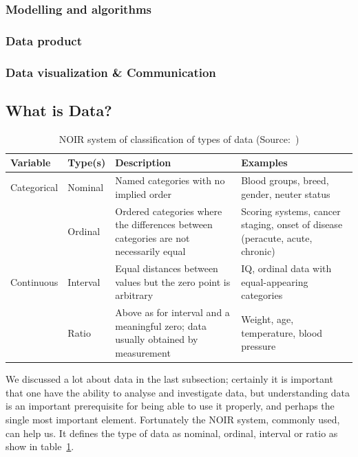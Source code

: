 \subsubsection{Modelling and algorithms}

\subsubsection{Data product}

\subsubsection{Data visualization \& Communication}

\subsection{What is Data?}
\begin{table}[!ht]
    \begin{tabularx}{\textwidth}{ 
    | >{\raggedright\arraybackslash} m{1.8cm} 
    | >{\raggedright\arraybackslash} m{1.8cm}
    | >{\raggedright\arraybackslash} X 
    | >{\raggedright\arraybackslash} X | }
    \toprule
    \hfil\bfseries Variable & \hfil\bfseries Type(s) & \hfil\bfseries Description & \hfil\bfseries Examples \\ 
    \midrule
    Categorical & Nominal & Named categories with no implied order & Blood groups, breed, gender, neuter status \\
    ~ & Ordinal & Ordered categories where the differences between categories are not necessarily equal & Scoring systems, cancer staging, onset of disease (peracute, acute, chronic) \\ 
    \midrule
    Continuous & Interval & Equal distances between values but the zero point is arbitrary & IQ, ordinal data with equal-appearing categories\\
    ~ & Ratio & Above as for interval and a meaningful zero; data usually obtained by measurement & Weight, age, temperature, blood pressure \\
    \bottomrule
    \end{tabularx}
\caption{NOIR system of classification of types of data (Source:~\cite{Article:intro_to_data_analysis})}
\label{table:noir_sys}     
\end{table}
We discussed a lot about data in the last subsection; certainly it is important that one have the ability to analyse and investigate data, but 
understanding data is an important prerequisite for being able to use it properly, and perhaps the single most important element.
Fortunately the NOIR system, commonly used, can help us. It defines the type of data as nominal, ordinal, interval or ratio as show in table~\ref{table:noir_sys}.

